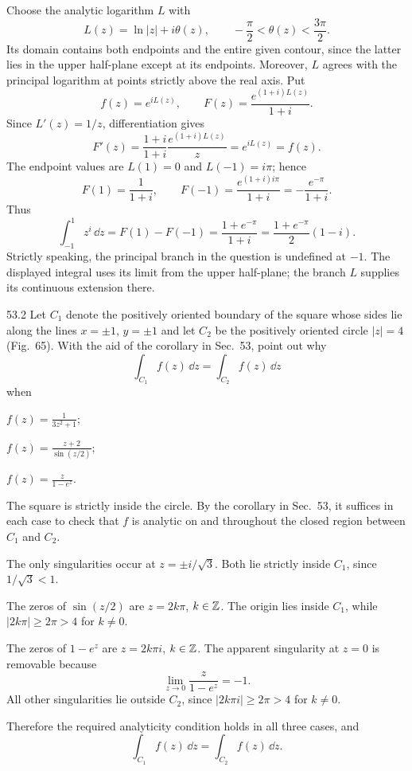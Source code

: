 \documentclass[11pt,oneside]{article}
\begin{document}
\begin{solution}
Choose the analytic logarithm $L$ with
\[
    L(z)=\ln|z|+i\theta(z), \qquad -\frac\pi2<\theta(z)<\frac{3\pi}{2}.
\]
Its domain contains both endpoints and the entire given contour, since the latter lies in the upper half-plane except at its endpoints. Moreover, $L$ agrees with the principal logarithm at points strictly above the real axis. Put
\[
    f(z)=e^{iL(z)}, \qquad
    F(z)=\frac{e^{(1+i)L(z)}}{1+i}.
\]
Since $L'(z)=1/z$, differentiation gives
\[
    F'(z)=\frac{1+i}{1+i}\frac{e^{(1+i)L(z)}}{z}
    =e^{iL(z)}=f(z).
\]
The endpoint values are $L(1)=0$ and $L(-1)=i\pi$; hence
\[
    F(1)=\frac1{1+i}, \qquad
    F(-1)=\frac{e^{(1+i)i\pi}}{1+i}=-\frac{e^{-\pi}}{1+i}.
\]
Thus
\[
    \boxed{\int_{-1}^{1}z^i\,\dd z=F(1)-F(-1)
       =\frac{1+e^{-\pi}}{1+i}=\frac{1+e^{-\pi}}2(1-i).}
\]
Strictly speaking, the principal branch in the question is undefined at $-1$. The displayed integral uses its limit from the upper half-plane; the branch $L$ supplies its continuous extension there.
\end{solution}

\begin{exercise}{53.2}
Let $C_1$ denote the positively oriented boundary of the square whose sides lie along the lines $x=\pm1$, $y=\pm1$ and let $C_2$ be the positively oriented circle $|z|=4$ (Fig.~65). With the aid of the corollary in Sec.~53, point out why
\[
    \int_{C_1}f(z)\,\dd z=\int_{C_2}f(z)\,\dd z
\]
when
\begin{exercisesubparts}
\item $\displaystyle f(z)=\frac1{3z^2+1}$;
\item $\displaystyle f(z)=\frac{z+2}{\sin(z/2)}$;
\item $\displaystyle f(z)=\frac z{1-e^z}$.
\end{exercisesubparts}
\end{exercise}

\begin{solution}
The square is strictly inside the circle. By the corollary in Sec.~53, it suffices in each case to check that $f$ is analytic on and throughout the closed region between $C_1$ and $C_2$.
\begin{exercisesubparts}
\item The only singularities occur at $z=\pm i/\sqrt3$. Both lie strictly inside $C_1$, since $1/\sqrt3<1$.
\item The zeros of $\sin(z/2)$ are $z=2k\pi$, $k\in\mathbb{Z}$. The origin lies inside $C_1$, while $|2k\pi|\ge2\pi>4$ for $k\ne0$.
\item The zeros of $1-e^z$ are $z=2k\pi i$, $k\in\mathbb{Z}$. The apparent singularity at $z=0$ is removable because
\[
    \lim_{z\to0}\frac z{1-e^z}=-1.
\]
All other singularities lie outside $C_2$, since $|2k\pi i|\ge2\pi>4$ for $k\ne0$.
\end{exercisesubparts}
Therefore the required analyticity condition holds in all three cases, and
\[
    \boxed{\int_{C_1}f(z)\,\dd z=\int_{C_2}f(z)\,\dd z.}
\]
\end{solution}
\end{document}
